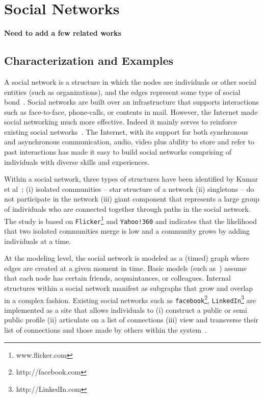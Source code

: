 \section{Social Networks} %
\label{sec:social_networks}

\textbf{Need to add a few related works}

\subsection{Characterization and Examples} %
\label{sub:characterization_and_examples}

A social network is a structure in which the nodes are individuals or other social entities (such as organizations), and the edges represent some type of social bond~\cite{Boyd-Ellison:07}. Social networks are built over an infrastructure that supports interactions such as face-to-face, phone-calls, or contents in  mail. However, the Internet made social networking much more effective. Indeed it mainly serves to reinforce existing social networks~\cite{Kleinberg-Backstrom-Huttenlocher-Xiangyang:06}. The Internet, with its support for both synchronous and asynchronous communication, audio, video plus ability to store and refer to past interactions  has made it easy to build  social networks comprising of individuals with diverse skills and experiences.

Within a social network, three types of structures have been identified by Kumar et al~\cite{Kumar-Novak-Tomkins:06}; (i)
isolated communities -- star structure of a network (ii) singletons -- do not participate in the network (iii) giant
component that represents a large group of individuals who are connected together through paths in the social network.
The study is based on \texttt{Flicker}\footnote{www.flicker.com} and \texttt{Yahoo!360} and indicates that the likelihood
that two isolated communities merge is low and a community grows by adding individuals at a time.

At the modeling level, the social network is modeled as a (timed) graph where edges are created at a given moment in
time. Basic models (such as~\cite{Kleinberg-Backstrom-Huttenlocher-Xiangyang:06}) assume that each node has certain
friends, acquaintances, or colleagues. Internal structures within a social network manifest as subgraphs that grow and
overlap in a complex fashion. Existing social networks such as \texttt{facebook}\footnote{http://facebook.com},
\texttt{LinkedIn}\footnote{http://LinkedIn.com} are implemented as a site that allows individuals to (i) construct a
public or semi public profile (ii) articulate on a list of connections (iii) view and transverse their list of
connections and those made by others within the system~\cite{Boyd-Ellison:07}.

